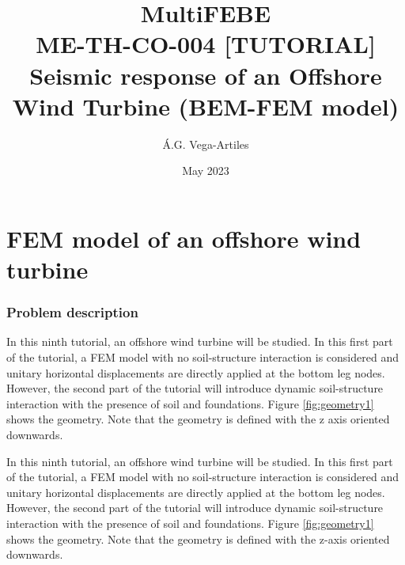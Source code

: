 \documentclass[a4]{article}
\title{MultiFEBE \\ ME-TH-CO-004 [TUTORIAL] \\ Seismic response of an Offshore Wind Turbine (BEM-FEM model)}
\author{\'A.G. Vega-Artiles}
\date{May 2023}
\begin{document}
\maketitle

\tableofcontents

\part{FEM model of an offshore wind turbine}

\section{Problem description}


In this ninth tutorial, an offshore wind turbine will be studied. In this first part of the tutorial, a FEM model with no soil-structure interaction is considered and unitary horizontal displacements are directly applied at the bottom leg nodes. However, the second part of the tutorial will introduce dynamic soil-structure interaction with the presence of soil and foundations. Figure \ref{fig:geometry1} shows the geometry. Note that the geometry is defined with the z axis oriented downwards.

In this ninth tutorial, an offshore wind turbine will be studied. In this first part of the tutorial, a FEM model with no soil-structure interaction is considered and unitary horizontal displacements are directly applied at the bottom leg nodes. However, the second part of the tutorial will introduce dynamic soil-structure interaction with the presence of soil and foundations. Figure \ref{fig:geometry1} shows the geometry. Note that the geometry is defined with the z-axis oriented downwards.
\end{document}
